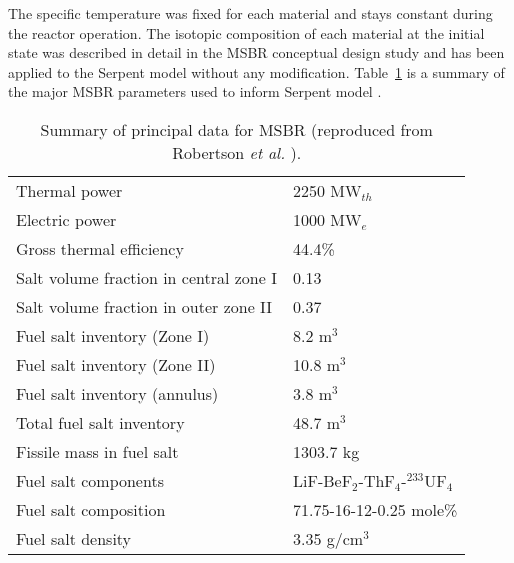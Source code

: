 The specific temperature was fixed for each material and stays constant during 
the reactor operation. The isotopic composition of each material at the 
initial state was described in detail in the MSBR conceptual design study 
\cite{robertson_conceptual_1971} and has been applied to the Serpent model 
without any modification. Table~\ref{tab:msbr_tab} is a summary of the major 
\gls{MSBR} parameters used to inform Serpent model  
\cite{robertson_conceptual_1971}. 
\begin{table}[h!]
	\caption{Summary of principal data for \gls{MSBR} (reproduced from 
	Robertson \emph{et al.} \cite{robertson_conceptual_1971}).}
	\begin{tabularx}{\textwidth}{ X  X}
		\hline
		Thermal power           					& 2250 MW$_{th}$\\
		Electric power             					& 1000 MW$_e$   \\
		Gross thermal efficiency       				& 44.4\%        \\
		Salt volume fraction in central zone I		& 0.13   		\\
		Salt volume fraction in outer zone II       & 0.37			\\
		Fuel salt inventory (Zone I)                & 8.2 m$^3$		\\
		Fuel salt inventory (Zone II)               & 10.8 m$^3$	\\
		Fuel salt inventory (annulus)               & 3.8 m$^3$		\\
		Total fuel salt inventory                   & 48.7 m$^3$	\\
		Fissile mass in fuel salt                   & 1303.7 kg		\\
		Fuel salt components   	& LiF-BeF$_2$-ThF$_4$-$^{233}$UF$_4$\\  
		Fuel salt composition   & 71.75-16-12-0.25 mole\%			\\
		Fuel salt density       & 3.35 g/cm$^3$         			\\ \hline
	\end{tabularx}
	\label{tab:msbr_tab}
\end{table}

